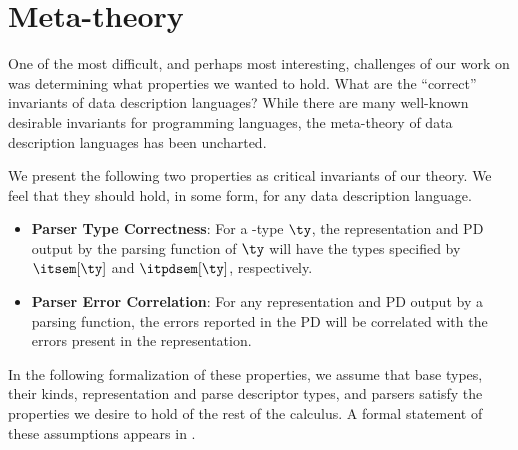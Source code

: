 \section{Meta-theory}
\label{sec:meta-theory}


One of the most difficult, and perhaps most interesting, challenges of our
work on \ddc{} was determining what
properties we wanted to hold. What are the ``correct''
invariants of data description languages? While there are many
well-known desirable invariants for programming languages, the
meta-theory of data description languages has been
uncharted.

We present the following two properties as critical invariants of
our theory. We feel that they should hold, in some form, for any data
description language.
\begin{itemize}
\item {\bf Parser Type Correctness}: For a \ddc{}-type $\ty$, the
  representation and PD output by the parsing function of $\ty$ will
  have the types specified by $\itsem[\ty]$ and
  $\itpdsem[\ty]$, respectively.
  
\item {\bf Parser Error Correlation}: For any representation and PD output by a
  parsing function, the errors reported in the PD
  will be correlated with the errors present in the representation.
\end{itemize}

In the following formalization of these properties, we assume that \ddc{} base types, their kinds, representation and parse descriptor types, and parsers satisfy the properties we desire to hold of the rest of the calculus.  A formal statement of these assumptions appears in .

